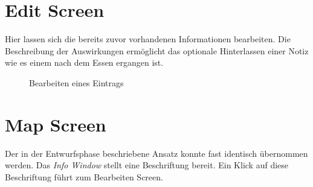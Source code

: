 \documentclass[
    DIV12,
    cleardouble=plain,
    headings=normal,
    pdftex,
    headexclude,footexclude,
    final
]{scrreprt}
\begin{document}
\section{Edit Screen}
Hier lassen sich die bereits zuvor vorhandenen Informationen bearbeiten. Die Beschreibung der Auswirkungen ermöglicht das optionale Hinterlassen einer Notiz wie es einem nach dem Essen ergangen ist.
\begin{figure}[H]
	\centering
	\caption{Bearbeiten eines Eintrags}
	\label{editScreen}
\end{figure}


\newpage

\section{Map Screen}
Der in der Entwurfsphase beschriebene Ansatz konnte fast identisch übernommen werden. Das \textit{Info Window} stellt eine Beschriftung bereit. Ein Klick auf diese Beschriftung führt zum Bearbeiten Screen.
\end{document}
